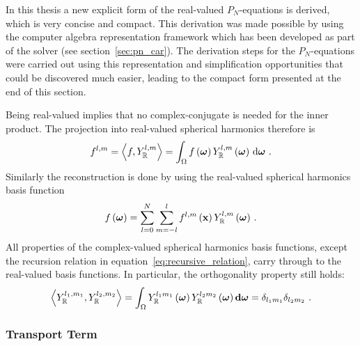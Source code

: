 In this thesis a new explicit form of the real-valued $P_N$-equations is derived, which is very concise and compact. This derivation was made possible by using the computer algebra representation framework which has been developed as part of the solver (see section~\ref{sec:pn_car}). The derivation steps for the $P_N$-equations were carried out using this representation and simplification opportunities that could be discovered much easier, leading to the compact form presented at the end of this section.

Being real-valued implies that no complex-conjugate is needed for the inner product. The projection into real-valued spherical harmonics therefore is
\begin{align}
\label{eq:sh_projection}
f^{l, m} = \left<f,Y_{\mathbb{R}}^{l, m}\right> = 
\int_\Omega f\left(\boldsymbol{\mathbf{\omega}}\right)Y_{\mathbb{R}}^{l,m}\left(\boldsymbol{\mathbf{\omega}}\right)\,\mathrm{d}\boldsymbol{\mathbf{\omega}}
\ .
\end{align}
Similarly the reconstruction is done by using the real-valued spherical harmonics basis function
\begin{align}
f\left(\boldsymbol{\mathbf{\omega}}\right) = 
\sum_{l=0}^{N}
{
\sum_{m=-l}^{l}
{
f^{l,m}\left(\boldsymbol{\mathbf{x}}\right)Y_{\mathbb{R}}^{l,m}\left(\boldsymbol{\mathbf{\omega}}\right)
}
}
\ .
\label{eq:sh_real_reconstruction}
\end{align}
All properties of the complex-valued spherical harmonics basis functions, except the recursion relation in equation~\ref{eq:recursive_relation}, carry through to the real-valued basis functions. In particular, the orthogonality property still holds:
\begin{align}
\label{eq:sh_orthogonality_real}
\left<Y_{\mathbb{R}}^{l_1, m_1},Y_{\mathbb{R}}^{l_2, m_2}\right>=
\int_{\Omega} Y_{\mathbb{R}}^{l_1m_1}\left(\boldsymbol{\mathbf{\omega}}\right) Y_{\mathbb{R}}^{l_2m_2}\left(\boldsymbol{\mathbf{\omega}}\right) \mathbf{d}\boldsymbol{\mathbf{\omega}} = \delta_{l_1m_1}\delta_{l_2m_2}
\ .
\end{align}

\subsubsection*{Transport Term}

